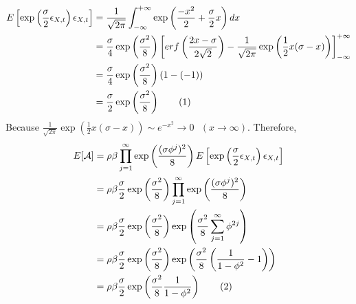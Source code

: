 \documentclass[11pt,a4,twosided,singlespacing,titlepagenumber=on]{scrreprt}
\numberwithin{equation}{chapter} %
\theoremstyle{remark}
\newcommand\numberthis{\addtocounter{equation}{1}\tag{\theequation}}
\begin{document}
\begin{align*}
E\left[\exp \left( \frac{\sigma}{2} \epsilon_{X,t} \right) \epsilon_{X,t} \right] &= \frac{1}{\sqrt{2\pi}} \int^{+\infty}_{-\infty} \exp \left( \frac{-x^2}{2} + \frac{\sigma}{2} x \right) dx \\
																				  &= \frac{\sigma}{4} \exp \left(\frac{\sigma^2}{8}\right) \left[ erf \left(\frac{2x-\sigma}{2\sqrt{2}} \right) - \frac{1}{\sqrt{2\pi}}\exp \left(\frac{1}{2} x(\sigma-x) \right) \right]^{+\infty}_{-\infty} \\
																				  &= \frac{\sigma}{4} \exp \left(\frac{\sigma^2}{8}\right) (1 - (-1)) \\
																				  &= \frac{\sigma}{2} \exp \left(\frac{\sigma^2}{8}\right) \numberthis
\end{align*}
Because $\frac{1}{\sqrt{2\pi}}\exp \left(\frac{1}{2} x(\sigma-x) \right) \sim e^{-x^2} \rightarrow 0 \text{ }(x \rightarrow \infty)$. Therefore, 
\begin{align*}
	E[\mathcal{A}] &= \rho \beta \prod_{j=1}^\infty \exp \left(\frac{(\sigma\phi^j)^2}{8} \right) E\left[\exp \left( \frac{\sigma}{2} \epsilon_{X,t} \right) \epsilon_{X,t} \right] \\
				   &= \rho \beta \frac{\sigma}{2} \exp \left(\frac{\sigma^2}{8}\right) \prod_{j=1}^\infty \exp \left(\frac{(\sigma\phi^j)^2}{8} \right) \\
				   &= \rho \beta \frac{\sigma}{2} \exp \left(\frac{\sigma^2}{8}\right) \exp \left( \frac{\sigma^2}{8} \sum_{j=1}^\infty \phi^{2j} \right) \\
				   &= \rho \beta \frac{\sigma}{2} \exp \left(\frac{\sigma^2}{8}\right) \exp \left( \frac{\sigma^2}{8} \left(\frac{1}{1-\phi^{2}} - 1\right)\right) \\
           &= \rho \beta \frac{\sigma}{2} \exp \left( \frac{\sigma^2}{8} \frac{1}{1-\phi^{2}} \right) \numberthis
\end{align*}
\end{document}
